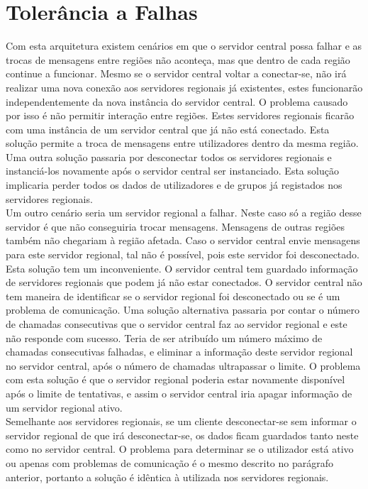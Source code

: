 \chapter{Tolerância a Falhas}

Com esta arquitetura existem cenários em que o servidor central possa falhar e as trocas de mensagens entre regiões não aconteça, mas que dentro de cada região continue a funcionar. Mesmo se o servidor central voltar a conectar-se, não irá realizar uma nova conexão aos servidores regionais já existentes, estes funcionarão independentemente da nova instância do servidor central. O problema causado por isso é não permitir interação entre regiões. Estes servidores regionais ficarão com uma instância de um servidor central que já não está conectado. Esta solução permite a troca de mensagens entre utilizadores dentro da mesma região. Uma outra solução passaria por desconectar todos os servidores regionais e instanciá-los novamente após o servidor central ser instanciado. Esta solução implicaria perder todos os dados de utilizadores e de grupos já registados nos servidores regionais.\\

Um outro cenário seria um servidor regional a falhar. Neste caso só a região desse servidor é que não conseguiria trocar mensagens. Mensagens de outras regiões também não chegariam à região afetada. Caso o servidor central envie mensagens para este servidor regional, tal não é possível, pois este servidor foi desconectado. Esta solução tem um inconveniente. O servidor central tem guardado informação de servidores regionais que podem já não estar conectados. O servidor central não tem maneira de identificar se o servidor regional foi desconectado ou se é um problema de comunicação.
Uma solução alternativa passaria por contar o número de chamadas consecutivas que o servidor central faz ao servidor regional e este não responde com sucesso. Teria de ser atribuído um número máximo de chamadas consecutivas falhadas, e eliminar a informação deste servidor regional no servidor central, após o número de chamadas ultrapassar o limite. O problema com esta solução é que o servidor regional poderia estar novamente disponível após o limite de tentativas, e assim o servidor central iria apagar informação de um servidor regional ativo.\\

Semelhante aos servidores regionais, se um cliente desconectar-se sem informar o servidor regional de que irá desconectar-se, os dados ficam guardados tanto neste como no servidor central. O problema para determinar se o utilizador está ativo ou apenas com problemas de comunicação é o mesmo descrito no parágrafo anterior, portanto a solução é idêntica à utilizada nos servidores regionais.